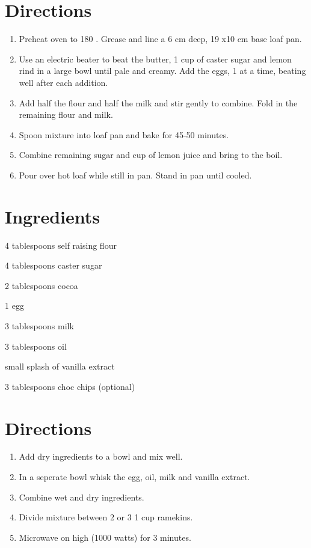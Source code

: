 \section*{Directions}
\begin{enumerate}
	\item Preheat oven to 180 \textcelsius . Grease and line a 6 cm deep, 19 x10 cm base loaf pan.
	\item Use an electric beater to beat the butter, 1 cup of caster sugar and lemon rind in a large bowl until pale and creamy.
		Add the eggs, 1 at a time, beating well after each addition.
	\item Add half the flour and half the milk and stir gently to combine. Fold in the remaining flour and milk.
	\item Spoon mixture into loaf pan and bake for 45-50 minutes.
	\item Combine remaining sugar and  cup of lemon juice and bring to the boil.
	\item Pour over hot loaf while still in pan.  Stand in pan until cooled.

\end{enumerate}


\bigskip
\section*{Ingredients}

\begin{ingredients-list}
	\item 4 tablespoons self raising flour
	\item 4 tablespoons caster sugar
	\item 2 tablespoons cocoa
	\item 1 egg
	\item 3 tablespoons milk
	\item 3 tablespoons oil
	\item small splash of vanilla extract
	\item 3 tablespoons choc chips (optional)
\end{ingredients-list}

\section*{Directions}
\begin{enumerate}
	\item Add dry ingredients to a bowl and mix well.
	\item In a seperate bowl whisk the egg, oil, milk and vanilla extract.
	\item Combine wet and dry ingredients.
	\item Divide mixture between 2 or 3 1 cup ramekins.
	\item Microwave on high (1000 watts) for 3 minutes.

\end{enumerate}


